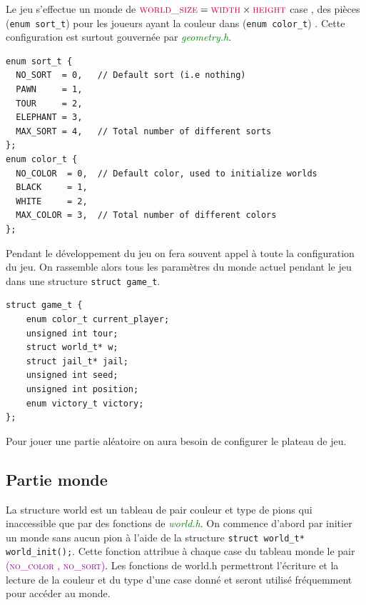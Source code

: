 \documentclass[a4paper]{article}
\begin{document}
Le jeu s’effectue un monde de $\textcolor{purple}{\textsc{world\_size}} = \textcolor{purple}{\textsc{width}} \times 
 \textcolor{purple}{\textsc{height}}$  case , des pièces (\lstinline|enum sort_t|) pour les joueurs ayant la couleur 
 dans (\lstinline|enum color_t|) . Cette configuration est surtout gouvernée par \textcolor{green}{\textit{geometry.h}}. \\
\begin{lstlisting}
enum sort_t {
  NO_SORT  = 0,   // Default sort (i.e nothing)
  PAWN     = 1,
  TOUR     = 2,
  ELEPHANT = 3,
  MAX_SORT = 4,   // Total number of different sorts
};
enum color_t {
  NO_COLOR  = 0,  // Default color, used to initialize worlds
  BLACK     = 1,
  WHITE     = 2,
  MAX_COLOR = 3,  // Total number of different colors 
};
\end{lstlisting}

Pendant le développement du jeu on fera souvent appel à toute la configuration du jeu. On rassemble alors tous les paramètres du monde
 actuel pendant le jeu dans une structure \lstinline|struct game_t|.
\begin{lstlisting}
struct game_t {
    enum color_t current_player;
    unsigned int tour;
    struct world_t* w;
    struct jail_t* jail;
    unsigned int seed;
    unsigned int position;
    enum victory_t victory;
};
\end{lstlisting}
Pour jouer une partie aléatoire on aura besoin de configurer le plateau de jeu.
\subsection{Partie monde}
La structure world est un tableau de pair couleur et type de pions qui inaccessible que par des fonctions de 
\textcolor{green}{\textit{world.h}}. On commence d’abord par initier un monde sans aucun pion à l’aide de la structure 
\lstinline|struct world_t* world_init();|. Cette fonction attribue à chaque case du tableau monde le pair 
\textcolor{purple}{\textsc{(no\_color , no\_sort)}}. Les fonctions de world.h permettront l’écriture et la lecture de la couleur et
 du type d’une case donné et seront utilisé fréquemment pour accéder au monde.  
 
\end{document}
